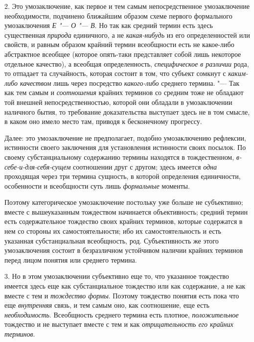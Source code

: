 {{2. Это умозаключение, как первое и тем самым непосредственное
умозаключение необходимости, подчинено ближайшим образом схеме первого
формального умозаключения {\em Е "--- О "--- В}. Но так как средний
термин есть здесь существенная
{\em природа} единичного,
а не {\em какая-нибудь}
из его определенностей или свойств, и равным образом крайний
термин всеобщности есть не какое-либо абстрактное всеобщее (которое
опять-таки представляет собой лишь некоторое отдельное качество), а
всеобщая определенность,
{\em специфическое в различии}
рода, то отпадает та случайность, которая состоит в том, что
субъект сомкнут с {\em каким-либо
качеством} лишь через посредство
{\em какого-либо}
среднего термина. "--- Так как тем самым и
{\em соотношения} крайних
терминов со средним тоже не обладают той внешней непосредственностью,
которой они обладали в умозаключении наличного бытия, то требование
доказательства выступает здесь не в том смысле, в каком оно
имело место там, приводя к бесконечному прогрессу.

Далее: это умозаключение не предполагает, подобно
умозаключению рефлексии, истинности своего заключения для установления
истинности своих посылок. По своему субстанциальному содержанию термины
находятся в тождественном,
{\em в-себе-и-для-себя-сущем}
соотношении друг с другом; здесь имеется
{\em одна} проходящая
через три термина сущность, в которой определения единичности, особенности
и всеобщности суть лишь
{\em формальные}
моменты.

Поэтому категорическое умозаключение постольку уже больше не
субъективно; вместе с вышеуказанным тождеством начинается объективность;
средний термин есть содержательное тождество своих крайних терминов,
которые содержатся в нем со стороны их самостоятельности; ибо их
самостоятельность и есть указанная субстанциальная всеобщность, род.
Субъективность же этого умозаключения состоит в безразличном устойчивом
наличии крайних терминов перед лицом понятия или среднего термина.

3. Но в этом умозаключении субъективно еще то, что указанное
тождество имеется здесь еще как субстанциальное тождество или как
содержание, а не как вместе с тем и
{\em тождество формы}.
Поэтому тождество понятия есть пока что еще
{\em внутренняя} связь, и
тем самым оно, как соотношение, еще есть
{\em необходимость}.
Всеобщность среднего термина есть плотное,
{\em положительное}
тождество и не выступает вместе с тем и как
{\em отрицательность его крайних
терминов}.

}}
